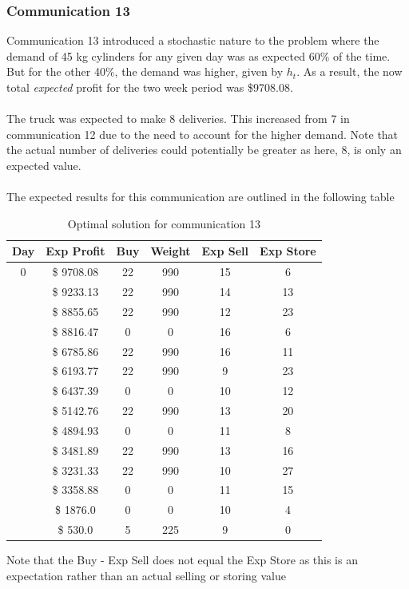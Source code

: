 \documentclass{article}
\begin{document}
\bigskip
\newpage
\subsubsection{Communication 13}
Communication 13 introduced a stochastic nature to the problem where the demand of 45 kg cylinders for any given day was as expected 60\% of the time. But for the other 40\%, the demand was higher, given by $h_t$. As a result, the now total \textit{expected} profit for the two week period was \$9708.08.\\
\\
The truck was expected to make 8 deliveries. This increased from 7 in communication 12 due to the need to account for the higher demand. Note that the actual number of deliveries could potentially be greater as here, 8, is only an expected value.\\
\\
The expected results for this communication are outlined in the following table

\renewcommand\baselinestretch{1.5}
\begin{table}[htb]
    \centering
    \color{black}
    \begin{tabular}{|c|c|c|c|c|c|}
      \hline
      \textbf{Day} & \textbf{Exp Profit} & \textbf{Buy} & \textbf{Weight} & \textbf{Exp Sell} & \textbf{Exp Store} \\
      \hline
      0   & \$ 9708.08 & 22 & 990 & 15 & 6  \\ \hdashline
      1   & \$ 9233.13 & 22 & 990 & 14 & 13 \\ \hdashline
      2   & \$ 8855.65 & 22 & 990 & 12 & 23 \\ \hdashline
      3   & \$ 8816.47 & 0  & 0   & 16 & 6  \\ \hdashline
      4   & \$ 6785.86 & 22 & 990 & 16 & 11 \\ \hdashline
      5   & \$ 6193.77 & 22 & 990 & 9  & 23 \\ \hdashline
      6   & \$ 6437.39 & 0  & 0   & 10 & 12 \\ \hdashline
      7   & \$ 5142.76 & 22 & 990 & 13 & 20 \\ \hdashline
      8   & \$ 4894.93 & 0  & 0   & 11 & 8  \\ \hdashline
      9   & \$ 3481.89 & 22 & 990 & 13 & 16 \\ \hdashline
      10  & \$ 3231.33 & 22 & 990 & 10 & 27 \\ \hdashline
      11  & \$ 3358.88 & 0  & 0   & 11 & 15 \\ \hdashline
      12  & \$ 1876.0  & 0  & 0   & 10 & 4  \\ \hdashline
      13  & \$ 530.0   & 5  & 225 & 9  & 0  \\
      \hline
    \end{tabular}
    \caption{Optimal solution for communication 13}
    \label{tab:comm13}
\end{table}
Note that the Buy - Exp Sell does not equal the Exp Store as this is an expectation rather than an actual selling or storing value
\renewcommand\baselinestretch{1}
\end{document}
